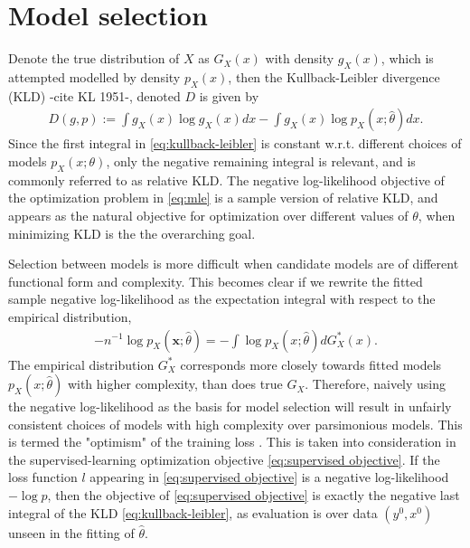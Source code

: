 \section{Model selection}
\label{sec:model selection}


Denote the true distribution of $X$ as $G_X(x)$ with density $g_X(x)$, which is attempted modelled by density $p_X(x)$, then the Kullback-Leibler divergence (KLD) -cite KL 1951-, denoted $D$ is given by 
\begin{align}\label{eq:kullback-leibler}
	D(g,p)
	:= \int g_X(x)\log g_X(x) dx - \int g_X(x)\log p_X(x;\hat{\theta}) dx.
\end{align}
Since the first integral in \eqref{eq:kullback-leibler} is constant w.r.t. different choices of models $p_X(x;\theta)$, only the negative remaining integral is relevant, and is commonly referred to as relative KLD.
The negative log-likelihood objective of the optimization problem in \eqref{eq:mle} is a sample version of relative KLD, and appears as the natural objective for optimization over different values of $\theta$, when minimizing KLD is the the overarching goal.

Selection between models is more difficult when candidate models are of different functional form and complexity.
This becomes clear if we rewrite the fitted sample negative log-likelihood as the expectation integral with respect to the empirical distribution,
\begin{align}\label{eq:loss-wrt-empirical-distribution}
	-n^{-1}\log p_X(\mathbf{x};\hat\theta) = -\int \log p_X(x;\hat{\theta}) dG_X^*(x).
\end{align}
The empirical distribution $G_X^*$ corresponds more closely towards fitted models $p_X(x;\hat\theta)$ with higher complexity, than does true $G_X$.
Therefore, naively using the negative log-likelihood as the basis for model selection will result in unfairly consistent choices of models with high complexity over parsimonious models.
This is termed the "optimism" of the training loss \citep{friedman2001elements}.
This is taken into consideration in the supervised-learning optimization objective \eqref{eq:supervised objective}.
If the loss function $l$ appearing in \eqref{eq:supervised objective} is a negative log-likelihood $-\log p$, then the objective of \eqref{eq:supervised objective} is exactly the negative last integral of the KLD \eqref{eq:kullback-leibler}, as evaluation is over data $(y^0,x^0)$ unseen in the fitting of $\hat\theta$.

